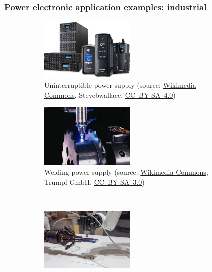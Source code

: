 \begin{frame}[c]
	\frametitle{Power electronic application examples: industrial}
	\begin{figure}
		\centering
		\begin{subfigure}[b]{0.49\textwidth}
			\centering
			\includegraphics[width=0.5\textwidth]{fig/lec01/UPS.jpg}
			\caption{Uninterruptible power supply (source: \href{https://commons.wikimedia.org/wiki/File:CyberPower_UPS_Systems.jpg}{Wikimedia Commons}, Stevebwallace, \href{https://creativecommons.org/licenses/by-sa/4.0/deed.en}{CC~BY-SA~4.0})}
		\end{subfigure}
		\hfill
		\begin{subfigure}[b]{0.49\textwidth}
			\centering
			\includegraphics[width=0.5\textwidth]{fig/lec01/Welding.jpg}
			\caption{Welding power supply (source: \href{https://commons.wikimedia.org/wiki/File:Trumpf_laserschweissen.jpg}{Wikimedia Commons}, Trumpf GmbH, \href{https://creativecommons.org/licenses/by-sa/3.0/deed.en}{CC~BY-SA~3.0})}
		\end{subfigure}
		\\
		\begin{subfigure}[b]{0.49\textwidth}
			\centering
			\includegraphics[width=0.5\textwidth]{fig/lec01/Robot.jpg}

\end{subfigure}
\end{figure}
\end{frame}
